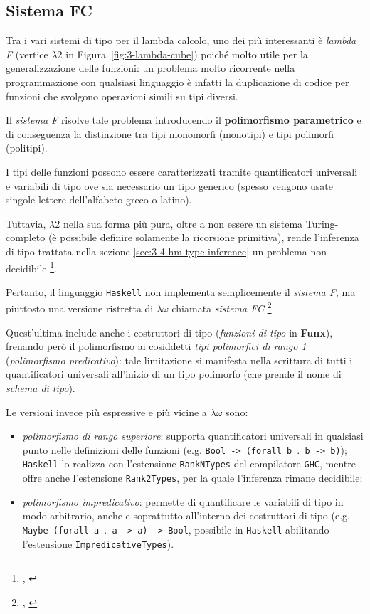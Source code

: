 \subsection{Sistema FC}
\label{sec:3-3-system-fc}

Tra i vari sistemi di tipo per il lambda calcolo, uno dei più interessanti è \textit{lambda F}
(vertice $\lambda2$ in Figura~\ref{fig:3-lambda-cube}) poiché molto utile per la generalizzazione delle funzioni:
un problema molto ricorrente nella programmazione con qualsiasi linguaggio è infatti la duplicazione di codice
per funzioni che svolgono operazioni simili su tipi diversi.


Il \textit{sistema F} risolve tale problema introducendo il \textbf{polimorfismo parametrico}
e di conseguenza la distinzione tra tipi monomorfi (monotipi) e tipi polimorfi (politipi).

\noindent I tipi delle funzioni possono essere caratterizzati tramite quantificatori universali e variabili di tipo
ove sia necessario un tipo generico (spesso vengono usate singole lettere dell'alfabeto greco o latino).


Tuttavia, $\lambda2$ nella sua forma più pura, oltre a non essere un sistema Turing-completo
(è possibile definire solamente la ricorsione primitiva), rende l'inferenza di tipo trattata nella sezione
\ref{sec:3-4-hm-type-inference} un problema non decidibile%
\footnote{, \cite{Wells-1999-TypabilityUndecidable}}.

\noindent Pertanto, il linguaggio \texttt{Haskell} non implementa semplicemente il \textit{sistema F},
ma piuttosto una versione ristretta di $\lambda\omega$ chiamata \textit{sistema FC}%
\footnote{, \cite{Eisenberg-2015-SystemFC}}.

\noindent Quest'ultima include anche i costruttori di tipo (\textit{funzioni di tipo} in \textbf{Funx}),
frenando però il polimorfismo ai cosiddetti \textit{tipi polimorfici di rango 1} (\textit{polimorfismo predicativo}):
tale limitazione si manifesta nella scrittura di tutti i quantificatori universali all'inizio di un tipo polimorfo
(che prende il nome di \textit{schema di tipo}).

\noindent Le versioni invece più espressive e più vicine a $\lambda\omega$ sono:
\begin{itemize}
    \item \textit{polimorfismo di rango superiore}: supporta quantificatori universali in qualsiasi punto
          nelle definizioni delle funzioni (e.g. \texttt{Bool -> (forall b $\mathord{.}$ b -> b)});
          \texttt{Haskell} lo realizza con l'estensione \texttt{RankNTypes} del compilatore \texttt{GHC},
          mentre offre anche l'estensione \texttt{Rank2Types}, per la quale l'inferenza rimane decidibile;
    \item \textit{polimorfismo impredicativo}: permette di quantificare le variabili di tipo in modo arbitrario,
          anche e soprattutto all'interno dei costruttori di tipo (e.g. \texttt{Maybe (forall a $\mathord{.}$ a -> a) -> Bool},
          possibile in \texttt{Haskell} abilitando l'estensione \texttt{ImpredicativeTypes}).
\end{itemize}

